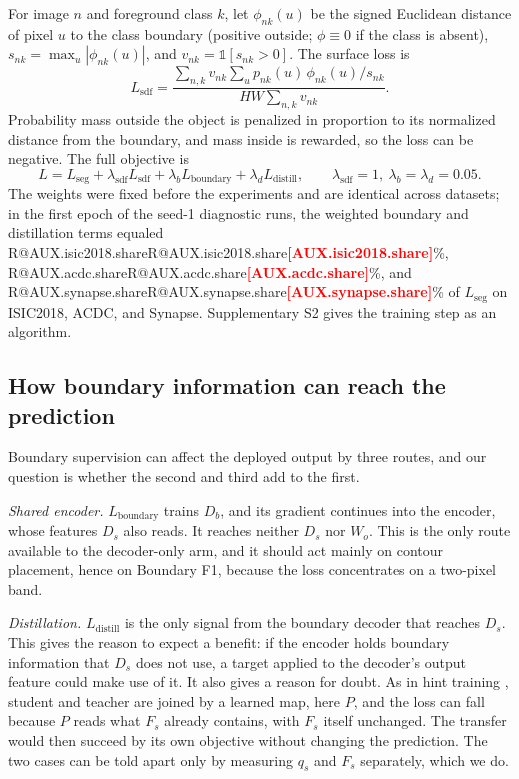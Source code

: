 \documentclass[fleqn,10pt,lineno]{wlpeerj}
\makeatletter
\newcommand{\R}[1]{\ifcsname R@#1\endcsname\csname R@#1\endcsname\else\textbf{\textcolor{red}{[#1]}}\fi}
\makeatother
\begin{document}
For image $n$ and foreground class $k$, let $\phi_{nk}(u)$ be the signed Euclidean distance of pixel $u$ to the class boundary (positive outside; $\phi\equiv0$ if the class is absent), $s_{nk}=\max_u|\phi_{nk}(u)|$, and $v_{nk}=\mathbb{1}[s_{nk}>0]$. The surface loss is
\begin{equation}
L_{\mathrm{sdf}}=\frac{\sum_{n,k}v_{nk}\sum_u p_{nk}(u)\,\phi_{nk}(u)/s_{nk}}{HW\sum_{n,k}v_{nk}}.
\label{eq:sdf}
\end{equation}
Probability mass outside the object is penalized in proportion to its normalized distance from the boundary, and mass inside is rewarded, so the loss can be negative. The full objective is
\begin{equation}
L=L_{\mathrm{seg}}+\lambda_{\mathrm{sdf}}L_{\mathrm{sdf}}+\lambda_bL_{\mathrm{boundary}}+\lambda_dL_{\mathrm{distill}},\qquad \lambda_{\mathrm{sdf}}=1,\ \lambda_b=\lambda_d=0.05.
\label{eq:bds}
\end{equation}
The weights were fixed before the experiments and are identical across datasets; in the first epoch of the seed-1 diagnostic runs, the weighted boundary and distillation terms equaled \R{AUX.isic2018.share}\%, \R{AUX.acdc.share}\%, and \R{AUX.synapse.share}\% of $L_{\mathrm{seg}}$ on ISIC2018, ACDC, and Synapse. Supplementary S2 gives the training step as an algorithm.

\subsection*{How boundary information can reach the prediction}
Boundary supervision can affect the deployed output by three routes, and our question is whether the second and third add to the first.

\emph{Shared encoder.} $L_{\mathrm{boundary}}$ trains $D_b$, and its gradient continues into the encoder, whose features $D_s$ also reads. It reaches neither $D_s$ nor $W_o$. This is the only route available to the decoder-only arm, and it should act mainly on contour placement, hence on Boundary F1, because the loss concentrates on a two-pixel band.

\emph{Distillation.} $L_{\mathrm{distill}}$ is the only signal from the boundary decoder that reaches $D_s$. This gives the reason to expect a benefit: if the encoder holds boundary information that $D_s$ does not use, a target applied to the decoder's output feature could make use of it. It also gives a reason for doubt. As in hint training \citep{Romero2015FitNets}, student and teacher are joined by a learned map, here $P$, and the loss can fall because $P$ reads what $F_s$ already contains, with $F_s$ itself unchanged. The transfer would then succeed by its own objective without changing the prediction. The two cases can be told apart only by measuring $q_s$ and $F_s$ separately, which we do.
\end{document}
